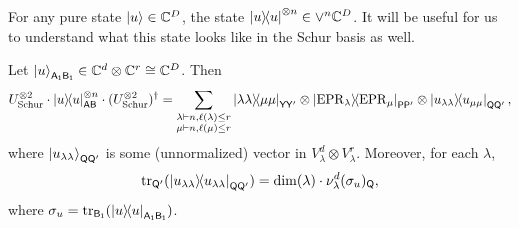 For any pure state $\ket{u} \in \mathbb C^D$, the state $\ketbra{u}^{\otimes n} \in \lor^n \mathbb C^D$. It will be useful for us to understand what this state looks like in the Schur basis as well. 

\begin{lemma}
\label{lem:double_schur_transform_pure_state}
    Let $\ket{u}_{\mathsf{A_1}\mathsf{B_1}} \in \mathbb C^d \otimes \mathbb C^r \cong \mathbb C^D$. Then 
    \begin{equation} \label{eq:double_schur_n_fold_pure_state}
        U_{\mathrm{Schur}}^{\otimes 2} \cdot \ketbra{u}^{\otimes n}_{\mathsf{AB}} \cdot (U_{\mathrm{Schur}}^{\otimes 2})^\dagger = \sum_{\substack{\lambda \vdash n, \ell(\lambda)\leq r \\ \mu \vdash n, \ell(\mu) \leq r}} \ketbra{\lambda \lambda}{\mu \mu}_{\mathsf{YY'}} \otimes \ketbra{\mathrm{EPR}_\lambda}{\mathrm{EPR}_{\mu}}_{\mathsf{PP'}} \otimes \ketbra{u_{\lambda \lambda}}{u_{\mu \mu}}_{\mathsf{QQ'}},
    \end{equation}
    where $\ket{u_{\lambda \lambda}}_{\mathsf{QQ'}}$ is some (unnormalized) vector in $V^d_\lambda \otimes V^r_\lambda$. Moreover, for each $\lambda$, \begin{equation}\label{eq:double_schur_n_fold_pure_state_partial_trace_restriction}
        \tr_{\mathsf{Q'}}( \ketbra{u_{\lambda \lambda}}_{\mathsf{QQ'}}) = \dim(\lambda) \cdot \nu_\lambda^d(\sigma_u)_{\mathsf{Q}},
    \end{equation}
    where $\sigma_u = \tr_{\mathsf{B_1}}(\ketbra{u}_{\mathsf{A_1B_1}})$.
\end{lemma}

